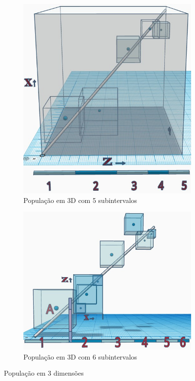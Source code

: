 	\begin{figure}[H]
	\centering
		\begin{subfigure}[H]{0.60\linewidth}
		\centering
		\includegraphics[width=1\linewidth]{sections/images/consciousness_space_3D_plan.jpg}
		\caption{População em 3D com 5 subintervalos}
		\label{fig:consciousness_space_3D_plan}
		\end{subfigure}
	
		\begin{subfigure}[H]{0.60\linewidth}
		\centering
		\includegraphics[width=1\linewidth]{sections/images/consciousness_space_3D_plan_subinterval.jpg}
		\caption{População em 3D com 6 subintervalos}
		\label{fig:consciousness_space_3D_plan_subinterval}
		\end{subfigure}%
	\caption{População em 3 dimensões}
	\end{figure}
